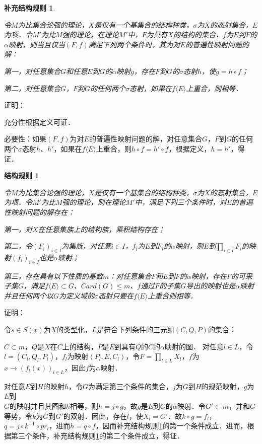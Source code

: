 \documentclass[12pt, a4paper, oneside]{book}
\newtheorem{CST}{结构规则}
\newtheorem{CSTcor}{补充结构规则}
\begin{document}
			\begin{CSTcor}\label{CSTcor15}
				\hfill\par
				令$M$为比集合论强的理论，$X$是仅有一个基集合的结构种类，$\sigma$为$X$的态射集合，$E$为项．令$M'$为比$M$强的理论，在理论$M'$中，$F$为具有$X$的结构的集合．$f$为$E$到$F$的$\alpha$映射，则当且仅当$(F, f)$满足下列两个条件时，其为对$E$的普遍性映射问题的解：
				\par
				第一，对任意集合$G$和任意$E$到$G$的$\alpha$映射$g$，存在$F$到$G$的$\sigma$态射$h$，使$g=h\circ f$；
				\par
				第二，对任意集合$G$，$F$到$G$的任何两个$\sigma$态射，如果在$f\langle E\rangle$上重合，则相等．
			\end{CSTcor}
			证明：
			\par
			充分性根据定义可证．
			\par
			必要性：如果$(F, f)$为对$E$的普遍性映射问题的解，对任意集合$G$，$F$到$G$的任何两个$\sigma$态射$h$、$h'$，如果在$f\langle E\rangle$上重合，则$h\circ f=h'\circ f$，根据定义，$h=h'$，得证．
			
			\begin{CST}\label{CST22}
				\hfill\par
				令$M$为比集合论强的理论，$X$是仅有一个基集合的结构种类，$\sigma$为$X$的态射集合，$E$为项．令$M'$为比$M$强的理论，则在理论$M'$中，满足下列三个条件时，对$E$的普遍性映射问题的解存在：
				\par
				第一，对$X$在任意集族上的结构族，乘积结构存在；
				\par
				第二，令$(F_i)_{i\in I}$为集族，对任意$i\in I$，$f_i$为$E$到$F_i$的$\alpha$映射，则$E$到$\prod\limits_{i\in I}F_i$的映射$(f_i)_{i\in I}$也是$\alpha$映射；
				\par
				第三，存在具有以下性质的基数$m$：对任意集合$F$和$E$到$F$的$\alpha$映射，存在$F$的可采子集$G$，满足$f\langle E\rangle\subset G$、$Card(G)\leq m$、$f$通过$F$的子集$G$导出的映射也是$\alpha$映射并且任何两个以$G$为定义域的$\sigma$态射只要在$f\langle E\rangle$上重合则相等．
			\end{CST}
			证明：
			\par
			令$s\in S(x)$为$X$的类型化，$L$是符合下列条件的三元组$(C, Q, P)$的集合：
			\par
			$C\subset m$，$Q$是$X$在$C$上的结构，$P$是$E$到具有$Q$的$C$的$\alpha$映射的图．
			对任意$l\in L$，令$l=(C_l, Q_l, P_l)$，$f_l$为映射$(P_l, E, C_l)$，令$F=\prod\limits_{l\in L}X_l$，$f$为$x\to (f_l(x))_{l\in L}$，因此$f$为$\alpha$映射．
			\par
			对任意$E$到$H$的映射$h$，令$G$为满足第三个条件的集合，$j$为$G$到$H$的规范映射，$g$为$E$到\\$G$的映射并且其图和$h$相等，则$h=j\circ g$，故$g$是$E$到$G$的$\alpha$映射．令$G'\subset m$，并和$G$等势，令$k$为$G$到$G'$的双射．因此，存在$l$，使$X_l=G'$．故$k\circ g= f_l$，$q=j\circ k^{-1}\circ pr_l$，进而$h=q\circ f$，因而补充结构规则\ref{CSTcor15}的第一个条件成立．进而，根据第三个条件，补充结构规则\ref{CSTcor15}的第二个条件成立，得证．
			
\end{document}
